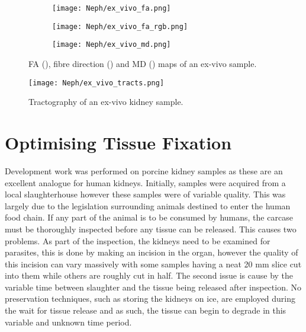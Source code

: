 \begin{figure}[H]
	\centering
	\begin{subfigure}[c]{0.31\textwidth}
		\centering
		\texttt{[image: Neph/ex\_vivo\_fa.png]} %
		\caption{}
		\label{fig:ex_ex_dti_fa}
	\end{subfigure}
	\hfill
	\begin{subfigure}[c]{0.31\textwidth}
		\centering
		\texttt{[image: Neph/ex\_vivo\_fa\_rgb.png]} %
		\caption{}
		\label{fig:ex_ex_dti_fa_rgb}
	\end{subfigure}
	\hfill	
	\begin{subfigure}[c]{0.31\textwidth}
		\centering
		\texttt{[image: Neph/ex\_vivo\_md.png]} %
		\caption{}
		\label{fig:ex_ex_dti_md}
	\end{subfigure}
	\caption{\ac{FA} (), fibre direction () and \ac{MD} () maps of an ex-vivo sample.}
	\label{fig:ex_ex_dti_maps}
\end{figure}

\begin{figure}[H]
	\centering
	\texttt{[image: Neph/ex\_vivo\_tracts.png]} %
	\caption{Tractography of an ex-vivo kidney sample.}
	\label{fig:ex_ex_tracts}	
\end{figure}

\newpage
\section{Optimising Tissue Fixation}
\label{sec:ex_tissue_fixation}
Development work was performed on porcine kidney samples as these are an excellent analogue for human kidneys. Initially, samples were acquired from a local slaughterhouse however these samples were of variable quality. This was largely due to the legislation surrounding animals destined to enter the human food chain. If any part of the animal is to be consumed by humans, the carcase must be thoroughly inspected before any tissue can be released. This causes two problems. As part of the inspection, the kidneys need to be examined for parasites, this is done by making an incision in the organ, however the quality of this incision can vary massively with some samples having a neat 20 mm slice cut into them while others are roughly cut in half. The second issue is cause by the variable time between slaughter and the tissue being released after inspection. No preservation techniques, such as storing the kidneys on ice, are employed during the wait for tissue release and as such, the tissue can begin to degrade in this variable and unknown time period.

